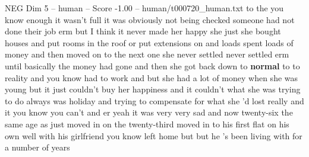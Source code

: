 \begin{textsample}{NEG Dim 5 – human – Score -1.00 – human/t000720\_human.txt}  \label{ex:f5_neg_037}
to the you know enough it wasn't full it was obviously not being checked someone had not done their job erm but I think it never made her happy she just she bought houses and put rooms in the roof or put extensions on and loads spent loads of money and then moved on to the next one she never settled never settled erm until basically the money had gone and then she got back down to \textbf{normal} to to reality and you know had to work and but she had a lot of money when she was young but it just couldn't buy her happiness and it couldn't what she was trying to do always was holiday and trying to compensate for what she 'd lost really and it you know you can't and er yeah it was very very sad and now twenty-six the same age as just moved in on the twenty-third moved in to his first flat on his own well with his girlfriend you know left home but but he 's been living with for a number of years

\end{textsample}
